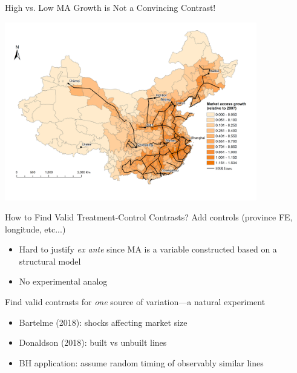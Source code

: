 \documentclass{beamer}
\begin{document}
\begin{frame}[t,label=LinePanel]{High vs. Low MA Growth is Not a Convincing Contrast!}
	\begin{center}
	\includegraphics[trim={1cm 0.5cm 0.5cm 1cm},clip,width=11cm]{lecture_includes/Line_panel2016.png}
	\end{center}
\end{frame}

\begin{frame}[label=HSR]{How to Find Valid Treatment-Control Contrasts?}
Add controls (province FE, longitude, etc...)
\vspace{0.05cm}
	\begin{itemize}
	\item Hard to justify \emph{ex ante} since MA is a variable constructed based on a structural model
	\vspace{0.1cm}
	\item No experimental analog
	\end{itemize}

\vspace{0.4cm}\pause
Find valid contrasts for \emph{one} source of variation---a natural experiment
\vspace{0.05cm}
	\begin{itemize}
	\item Bartelme (2018): shocks affecting market size
	\vspace{0.1cm}
	\item Donaldson (2018): built vs unbuilt lines
	\vspace{0.1cm}
	\item BH application: assume random timing of observably similar lines 
	\end{itemize}
\end{frame}
\end{document}

